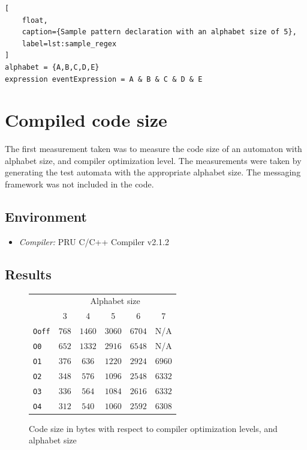\begin{lstlisting}[
	float,
	caption={Sample pattern declaration with an alphabet size of 5},
	label=lst:sample_regex
]
alphabet = {A,B,C,D,E}
expression eventExpression = A & B & C & D & E
\end{lstlisting}

\section{Compiled code size}

The first measurement taken was to measure the code size of an automaton with alphabet size, and compiler optimization level. The measurements were taken by generating the test automata with the appropriate alphabet size. The messaging framework was not included in the code.

\subsection{Environment}
\begin{itemize}
	\item \emph{Compiler:} PRU C/C++ Compiler v2.1.2
\end{itemize}

\subsection{Results}

\begin{figure}
	\centering
	\caption{Code size in bytes with respect to compiler optimization levels, and alphabet size}
	\begin{tabular}{l c c c c c}
		\toprule
		& \multicolumn{5}{c}{Alphabet size} \\
		\cmidrule(r){2-6}
		& 3 & 4 & 5 & 6 & 7 \\
		\midrule
		\texttt{Ooff} & $768$ &		$1460$ &	$3060$ & 	$6704$ & 	N/A \\
		\texttt{O0}   & $652$ &		$1332$ &	$2916$ & 	$6548$ & 	N/A \\
		\texttt{O1}   & $376$ &		$636$ &		$1220$ & 	$2924$ & 	$6960$ \\
		\texttt{O2}   & $348$ &		$576$ &		$1096$ & 	$2548$ & 	$6332$ \\
		\texttt{O3}   & $336$ &		$564$ &		$1084$ & 	$2616$ & 	$6332$ \\
		\texttt{O4}   & $312$ &		$540$ &		$1060$ & 	$2592$ & 	$6308$  \\
		\bottomrule
	\end{tabular}
\end{figure}


